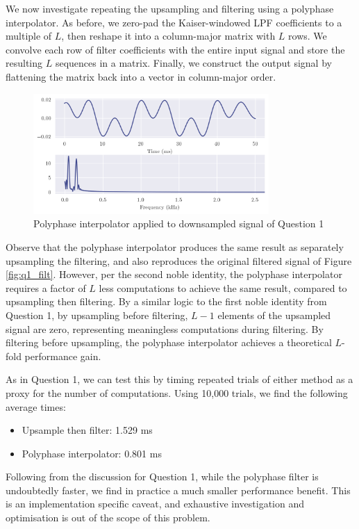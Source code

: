 We now investigate repeating the upsampling and filtering using a polyphase interpolator. As before, we zero-pad the Kaiser-windowed LPF coefficients to a multiple of $L$, then reshape it into a column-major matrix with $L$ rows. We convolve each row of filter coefficients with the entire input signal and store the resulting $L$ sequences in a matrix. Finally, we construct the output signal by flattening the matrix back into a vector in column-major order.

\newpage

\begin{figure}[ht]
    \centering
    \includegraphics[width=0.8\textwidth]{images/q2_polyinterpolate.png}
    \caption{Polyphase interpolator applied to downsampled signal of Question 1}
    \label{fig:q2_polyinterpolate}
\end{figure}

Observe that the polyphase interpolator produces the same result as separately upsampling the filtering, and also reproduces the original filtered signal of Figure \ref{fig:q1_filt}. However, per the second noble identity, the polyphase interpolator requires a factor of $L$ less computations to achieve the same result, compared to upsampling then filtering. By a similar logic to the first noble identity from Question 1, by upsampling before filtering, $L-1$ elements of the upsampled signal are zero, representing meaningless computations during filtering. By filtering before upsampling, the polyphase interpolator achieves a theoretical $L$-fold performance gain.

As in Question 1, we can test this by timing repeated trials of either method as a proxy for the number of computations. Using 10,000 trials, we find the following average times:
\begin{itemize}
    \item Upsample then filter: 1.529 ms
    \item Polyphase interpolator: 0.801 ms
\end{itemize}
Following from the discussion for Question 1, while the polyphase filter is undoubtedly faster, we find in practice a much smaller performance benefit. This is an implementation specific caveat, and exhaustive investigation and optimisation is out of the scope of this problem.
